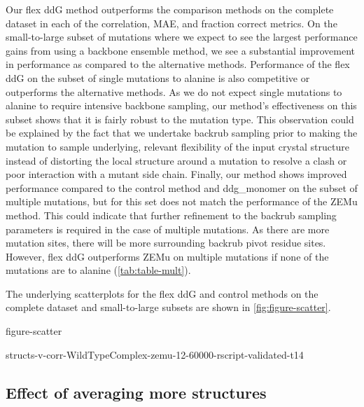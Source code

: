 Our flex ddG method outperforms the comparison methods on the complete dataset in each of the correlation, MAE, and fraction correct metrics. On the small-to-large subset of mutations where we expect to see the largest performance gains from using a backbone ensemble method, we see a substantial improvement in performance as compared to the alternative methods.
Performance of the flex ddG on the subset of single mutations to alanine is also competitive or outperforms the alternative methods.
As we do not expect single mutations to alanine to require intensive backbone sampling, our method's effectiveness on this subset shows that it is fairly robust to the mutation type.
This observation could be explained by the fact that we undertake backrub sampling prior to making the mutation to sample underlying, relevant flexibility of the input crystal structure instead of distorting the local structure around a mutation to resolve a clash or poor interaction with a mutant side chain.
Finally, our method shows improved performance compared to the control method and ddg\_monomer on the subset of multiple mutations, but for this set does not match the performance of the ZEMu method.
This could indicate that further refinement to the backrub sampling parameters is required in the case of multiple mutations.
As there are more mutation sites, there will be more surrounding backrub pivot residue sites.
However, flex ddG outperforms ZEMu on multiple mutations if none of the mutations are to alanine (\cref{tab:table-mult}).

The underlying scatterplots for the flex ddG and control methods on the complete dataset and small-to-large subsets are shown in \cref{fig:figure-scatter}. %

{figure-scatter}

{structs-v-corr-WildTypeComplex-zemu-12-60000-rscript-validated-t14}


\subsection{Effect of averaging more structures}

